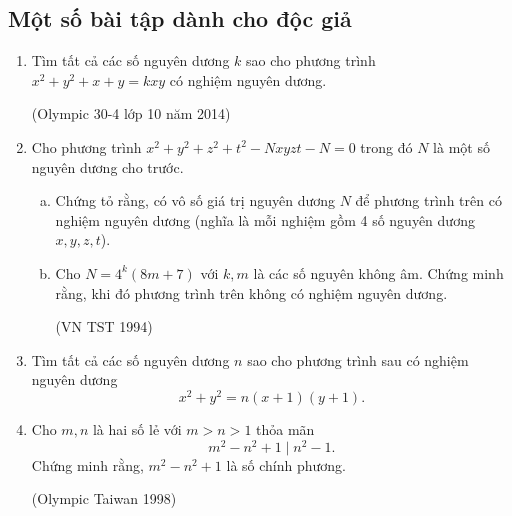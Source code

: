\subsection{Một số bài tập dành cho độc giả}
\begin{enumerate}[1.]
	\item Tìm tất cả các số nguyên dương $k$ sao cho phương trình $x^2+y^2+x+y=kxy$ có nghiệm nguyên dương.
	\begin{flushright}
		(Olympic 30-4 lớp 10 năm 2014)
	\end{flushright}
	\item Cho phương trình $x^2+y^2+z^2+t^2-Nxyzt-N=0$ trong đó $N$ là một số nguyên dương cho trước.
	\begin{enumerate}[a)]
		\item Chứng tỏ rằng, có vô số giá trị nguyên dương $N$ để phương trình trên có nghiệm nguyên dương (nghĩa là mỗi nghiệm gồm 4 số nguyên dương $x,y,z,t$).
		\item Cho $N=4^k(8m+7)$ với $k,m$ là các số nguyên không âm. Chứng minh rằng, khi đó phương trình trên không có nghiệm nguyên dương. 
		\begin{flushright}
			(VN TST 1994)
		\end{flushright}
	\end{enumerate}
	\item Tìm tất cả các số nguyên dương $n$ sao cho phương trình sau có nghiệm nguyên dương \[x^2+y^2=n(x+1)(y+1).\]
	\item Cho $m,n$ là hai số lẻ với $m>n>1$ thỏa mãn
	\[m^2-n^2+1 \mid n^2-1. \]
	Chứng minh rằng, $m^2-n^2+1$ là số chính phương.
	\begin{flushright}
		(Olympic Taiwan 1998)
	\end{flushright}
	

\end{enumerate}
